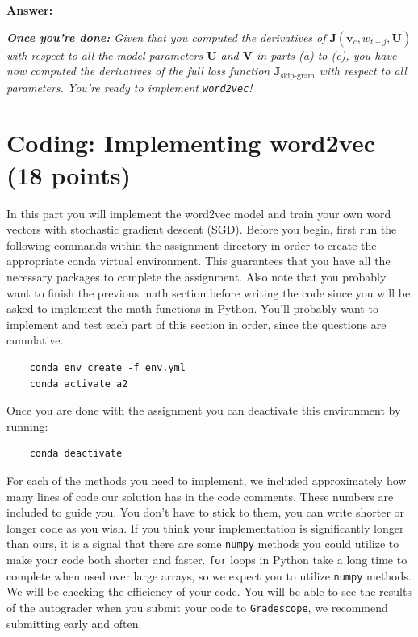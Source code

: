 \documentclass{article}
\newenvironment{answer}{
    {\bf Answer:} \sf \begingroup\color{red}
}{\endgroup}%
\begin{document}
\begin{enumerate}[label=(\alph*)]
\begin{shaded}
\begin{answer}
\end{answer}
\end{shaded}

\textit{\textbf{Once you're done:} Given that you computed the derivatives of $\bm J(\bm v_c, w_{t+j}, \bm U)$ with respect to all the model parameters $\bm U$ and $\bm V$ in parts (a) to (c), you have now computed the derivatives of the full loss function $\bm J_{\text{skip-gram}}$ with respect to all parameters. You're ready to implement \texttt{word2vec}!} %

\end{enumerate}

\section{Coding: Implementing word2vec (18 points)}
In this part you will implement the word2vec model and train your own word vectors with stochastic gradient descent (SGD). Before you begin, first run the following commands within the assignment directory in order to create the appropriate conda virtual environment. This guarantees that you have all the necessary packages to complete the assignment. Also note that you probably want to finish the previous math section before writing the code since you will be asked to implement the math functions in Python. You’ll probably want to implement and test each part of this section in order, since the questions are cumulative.

\begin{verbatim}
    conda env create -f env.yml
    conda activate a2
\end{verbatim}

Once you are done with the assignment you can deactivate this environment by running:
\begin{verbatim}
    conda deactivate
\end{verbatim}

For each of the methods you need to implement, we included approximately how many lines of code our solution has in the code comments. These numbers are included to guide you. You don't have to stick to them, you can write shorter or longer code as you wish. If you think your implementation is significantly longer than ours, it is a signal that there are some \texttt{numpy} methods you could utilize to make your code both shorter and faster. \texttt{for} loops in Python take a long time to complete when used over large arrays, so we expect you to utilize \texttt{numpy} methods. We will be checking the efficiency of your code. You will be able to see the results of the autograder when you submit your code to \texttt{Gradescope}, we recommend submitting early and often.
\end{document}
